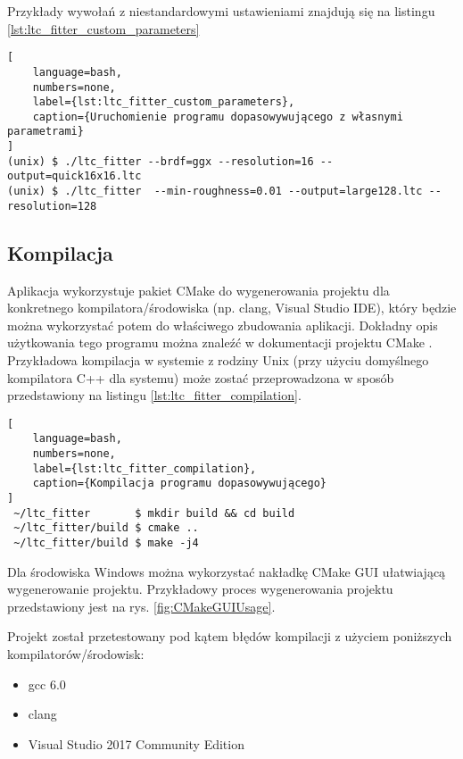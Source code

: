 \documentclass[../main.tex]{subfiles}
\begin{document}
Przykłady wywołań z niestandardowymi ustawieniami znajdują się na listingu \ref{lst:ltc_fitter_custom_parameters}

\begin{lstlisting}[
    language=bash,
    numbers=none,
    label={lst:ltc_fitter_custom_parameters},
    caption={Uruchomienie programu dopasowywującego z własnymi parametrami}
]
(unix) $ ./ltc_fitter --brdf=ggx --resolution=16 --output=quick16x16.ltc
(unix) $ ./ltc_fitter  --min-roughness=0.01 --output=large128.ltc --resolution=128
\end{lstlisting}

\subsection{Kompilacja}
\label{section:ltcFitterCompilation}

Aplikacja wykorzystuje pakiet CMake do wygenerowania projektu dla konkretnego kompilatora/środowiska (np. clang, Visual Studio IDE), który będzie można wykorzystać potem do właściwego zbudowania aplikacji. Dokładny opis użytkowania tego programu można znaleźć w dokumentacji projektu CMake \cite{CMakeDoc}. Przykładowa kompilacja w systemie z rodziny Unix (przy użyciu domyślnego kompilatora C++ dla systemu) może zostać przeprowadzona w sposób przedstawiony na listingu \ref{lst:ltc_fitter_compilation}.

\begin{lstlisting}[
    language=bash,
    numbers=none,
    label={lst:ltc_fitter_compilation},
    caption={Kompilacja programu dopasowywującego}
]
 ~/ltc_fitter       $ mkdir build && cd build
 ~/ltc_fitter/build $ cmake ..
 ~/ltc_fitter/build $ make -j4
\end{lstlisting}

Dla środowiska Windows można wykorzystać nakładkę CMake GUI ułatwiającą wygenerowanie projektu. Przykładowy proces wygenerowania projektu przedstawiony jest na rys. \ref{fig:CMakeGUIUsage}.

Projekt został przetestowany pod kątem błędów kompilacji z użyciem poniższych kompilatorów/środowisk:
\begin{itemize}
    \item gcc 6.0
    \item clang
    \item Visual Studio 2017 Community Edition
\end{itemize}
\end{document}
